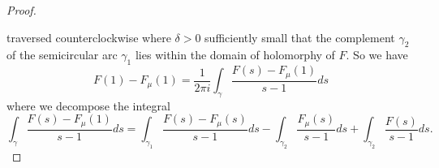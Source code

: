 \begin{proof}
\begin{center}

    \end{center}
    traversed counterclockwise where $\delta>0$ sufficiently small that the complement $\gamma_{2}$ of the semicircular arc $\gamma_{1}$ lies within the domain of holomorphy of $F$. So we have 
    $$F(1)-F_{\mu}(1)=\frac{1}{2\pi i}\int_{\gamma}\frac{F(s)-F_{\mu}(1)}{s-1}ds$$
    where we decompose the integral 
    \begin{equation}\label{eqn: integral sum decomposition}
        \int_{\gamma}\frac{F(s)-F_{\mu}(1)}{s-1}ds = \int_{\gamma_{1}}\frac{F(s)-F_{\mu}(s)}{s-1}ds - \int_{\gamma_{2}}\frac{F_{\mu}(s)}{s-1}ds + \int_{\gamma_{2}}\frac{F(s)}{s-1}ds.
    \end{equation}


\end{proof}
